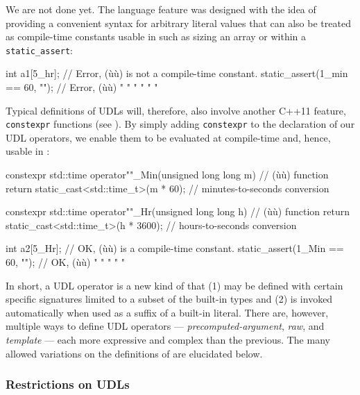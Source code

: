 \noindent We are not done yet. The  language feature was designed with
the idea of providing a convenient syntax for arbitrary literal values
that can also be treated as compile-time constants usable in
 such as sizing an array or within a
\lstinline!static_assert!:

\begin{emcppslisting}
int a1[5_hr];                    // Error, (ù{}ù) is not a compile-time constant.
static_assert(1_min == 60, "");  // Error, (ù{}ù) "  "  "    "      "     "
\end{emcppslisting}
    
\noindent Typical definitions of UDLs will, therefore, also involve another C++11
feature, \lstinline!constexpr! functions (see ). By simply adding
\lstinline!constexpr! to the declaration of our UDL operators, we enable
them to be evaluated at compile-time and, hence, usable in
:

\begin{emcppslisting}
constexpr std::time operator""_Min(unsigned long long m)  // (ù{}ù) function
{
    return static_cast<std::time_t>(m * 60);  // minutes-to-seconds conversion
}

constexpr std::time operator""_Hr(unsigned long long h)  // (ù{}ù) function
{
    return static_cast<std::time_t>(h * 3600);  // hours-to-seconds conversion
}

int a2[5_Hr];                    // OK, (ù{}ù) is a compile-time constant.
static_assert(1_Min == 60, "");  // OK, (ù{}ù) " "    "     "      "
\end{emcppslisting}
    
\noindent In short, a UDL operator is a new kind of  that
(1) may be defined with certain specific signatures limited to a subset
of the built-in types and (2) is invoked automatically when used as a
suffix of a built-in literal. There are, however, multiple ways to
define UDL operators --- \emph{precomputed-argument}, \emph{raw}, and
\emph{template} --- each more expressive and complex than the previous.
The many allowed variations on the definitions of 
are elucidated below.

\subsubsection[Restrictions on UDLs]{Restrictions on UDLs}\label{restrictions-on-user-defined-literals-(udls)}


